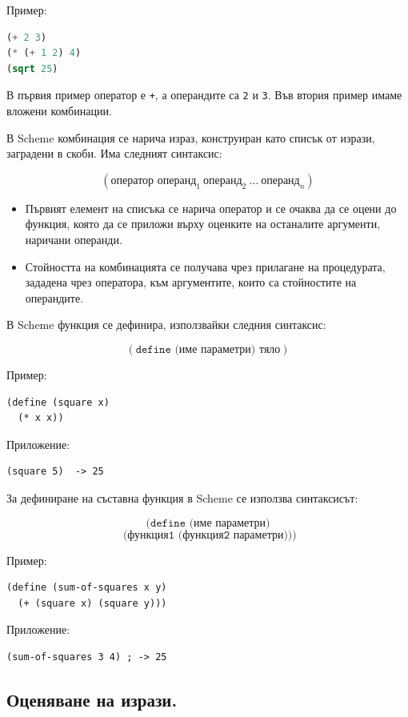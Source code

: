 \documentclass{article}
\renewcommand{\\}{\newline}
\begin{document}
Пример:
\begin{lstlisting}[language=Lisp]
(+ 2 3)
(* (+ 1 2) 4)
(sqrt 25)
\end{lstlisting}

В първия пример оператор е \texttt{+}, а операндите са \texttt{2} и \texttt{3}.  
Във втория пример имаме вложени комбинации.

В Scheme комбинация се нарича израз, конструиран като списък от изрази, заградени в скоби. Има следният синтаксис:

\[
(\texttt{оператор операнд}_1 \ \texttt{операнд}_2 \ \dots \ \texttt{операнд}_n)
\]

\begin{itemize}
    \item Първият елемент на списъка се нарича оператор и се очаква да се оцени до функция, която да се приложи върху оценките на останалите аргументи, наричани операнди.
    \item Стойността на комбинацията се получава чрез прилагане на процедурата, зададена чрез оператора, към аргументите, които са стойностите на операндите.
\end{itemize}

В Scheme функция се дефинира, използвайки следния синтаксис:

\[
(\texttt{define (име параметри) тяло})
\]

Пример:
\begin{lstlisting}
(define (square x)
  (* x x))
\end{lstlisting}

Приложение:
\begin{lstlisting}
(square 5)  -> 25
\end{lstlisting}

За дефиниране на съставна функция в Scheme се използва синтаксисът:

\[
(\texttt{define (име параметри)}
\]
\[
\texttt{   (функция1 (функция2 параметри))})
\]

Пример:
\begin{lstlisting}
(define (sum-of-squares x y)
  (+ (square x) (square y)))
\end{lstlisting}

Приложение:
\begin{lstlisting}
(sum-of-squares 3 4) ; -> 25
\end{lstlisting}


\subsection{Оценяване на изрази.}
\end{document}
